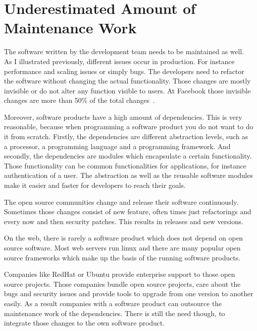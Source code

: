 \section{Underestimated Amount of Maintenance Work}

The software written by the development team needs to be maintained as well. As I
illustrated previously, different issues occur in production. For instance performance and
scaling issues or simply bugs. The developers need to refactor the software without
changing the actual functionality. Those changes are mostly invisible or do not alter any
function visible to users. At Facebook those invisible changes are more than 50\% of the
total changes~\cite{dev_at_fb}.

Moreover, software products have a high amount of dependencies. This is very reasonable,
because when programming a software product you do not want to do it from
scratch. Firstly, the dependencies are different abstraction levels, such as a processor,
a programming language and a programming framework. And secondly, the dependencies are
modules which encapsulate a certain functionality. Those functionality can be common
functionalities for applications, for instance authentication of a user. The abstraction
as well as the reusable software modules make it easier and faster for developers to reach
their goals.

The open source communities change and release their software continuously. Sometimes
those changes consist of new feature, often times just refactorings and every now and then
security patches. This results in releases and new versions.

On the web, there is rarely a software product which does not depend on open source
software. Most web servers run linux and there are many popular open source frameworks
which make up the basis of the running software products.

Companies like RedHat or Ubuntu provide enterprise support to those open source
projects. Those companies bundle open source projects, care about the bugs and
security issues and provide tools to upgrade from one version to another easily. As a
result companies with a software product can outsource the maintenance work of the
dependencies. There is still the need though, to integrate those changes to the own
software product.

